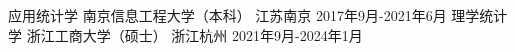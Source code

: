 \begin{educventries}
  \educventry
    {应用统计学} %
    {南京信息工程大学（本科）} %
    {江苏南京} %
    {2017年9月-2021年6月} %
    {}
  \educventry
    {理学统计学} %
    {浙江工商大学（硕士）} %
    {浙江杭州} %
    {2021年9月-2024年1月} %
    {}
\end{educventries}

